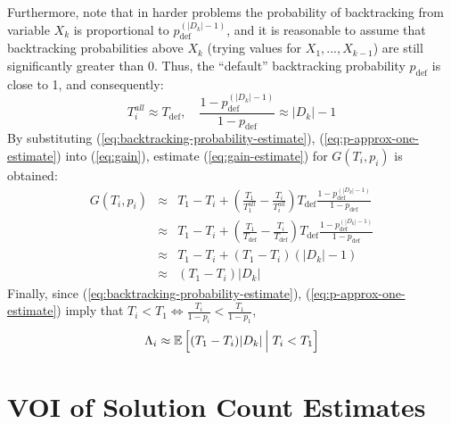 Furthermore, note that in harder problems  the probability of
backtracking from variable $X_k$ is proportional to $p_\mathrm{def}^{(|D_k|-1)}$, and it is
reasonable to assume that backtracking probabilities above $X_k$
(trying values for $X_1, ..., X_{k-1}$)  are still significantly greater than 0.
Thus, the ``default'' backtracking
probability $p_\mathrm{def}$ is close to 1, and consequently:
\begin{equation}
  \label{eq:p-approx-one-estimate}
T_i^{all} \approx T_\mathrm{def},\quad\frac{1-p_\mathrm{def}^{(|D_k|-1)}}{1-p_\mathrm{def}} \approx |D_k|-1
\end{equation}
By substituting (\ref{eq:backtracking-probability-estimate}),
(\ref{eq:p-approx-one-estimate}) into (\ref{eq:gain}),
estimate (\ref{eq:gain-estimate}) for $G(T_i, p_i)$ is obtained:
\begin{eqnarray}
\label{eq:gain-estimate}
G(T_i, p_i)&\approx&T_1-T_i+(\frac {T_1} {T_1^{all}}-\frac {T_i} {T_i^{all}})T_\mathrm{def}\frac{1-p_\mathrm{def}^{(|D_k|-1)}}{1-p_\mathrm{def}}\nonumber\\
           &\approx&T_1-T_i+(\frac {T_1} {T_\mathrm{def}}-\frac {T_i} {T_\mathrm{def}})T_\mathrm{def}\frac{1-p_\mathrm{def}^{(|D_k|-1)}}{1-p_\mathrm{def}}\nonumber\\
           &\approx&T_1-T_i+(T_1-T_i)(|D_k|-1)\nonumber\\
           &\approx&(T_1-T_i)|D_k|
\end{eqnarray}
Finally, since (\ref{eq:backtracking-probability-estimate}), (\ref{eq:p-approx-one-estimate}) imply that $T_i<T_1 \Leftrightarrow \frac {T_i} {1-p_i} < \frac {T_1} {1-p_1}$, 
\begin{eqnarray}
\label{eq:benefit-superestimate}
\Lambda_i\approx\mathbb{E}\left[(T_1-T_i)|D_k|\,\Big|\; T_i<T_1 \right]
\end{eqnarray}

\section{VOI of Solution Count Estimates}
\label{sec:csp-rational}

